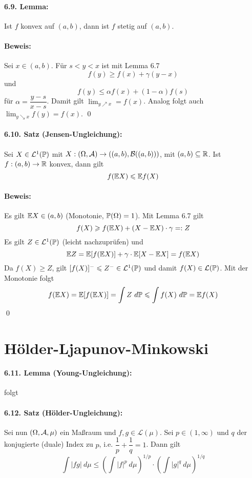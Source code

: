 \documentclass[12pt]{report}
\begin{document}
 \paragraph{6.9. Lemma:}Ist $f$ konvex auf $(a,b)$, dann ist $f$ stetig auf $(a,b)$.
 
 \paragraph{Beweis:}Sei $x\in(a,b)$. F\"ur $s<y<x$ ist mit Lemma 6.7
 $$f(y)\geq f(x)+\gamma (y-x)$$
 und 
 $$f(y)\leq \alpha f(x)+(1-\alpha)f(s)$$
 f\"ur $\alpha=\dfrac{y-s}{x-s}$. Damit gilt $\displaystyle\lim_{y\nearrow x}=f(x)$. Analog folgt auch $\lim_{y\searrow x}f(y)=f(x)$. \qed
 
 \paragraph{6.10. Satz (Jensen-Ungleichung):}Sei $X\in\mathcal{L}^1(\mathbb{P})$ mit $X:(\Omega,\mathcal{A})\to((a,b),\mathcal{B}((a,b)))$, mit $(a,b)\subseteq\mathbb{R}$. Ist $f:(a,b)\to\mathbb{R}$ konvex, dann gilt
 $$f(\mathbb{E} X)\leqslant \mathbb{E} f(X)$$
 
 \paragraph{Beweis:}Es gilt $\mathbb{E} X\in (a,b)$ (Monotonie, $\mathbb{P}(\Omega)=1$). Mit Lemma 6.7 gilt
 $$f(X)\geqslant f(\mathbb{E} X)+(X-\mathbb{E} X)\cdot \gamma=:Z$$
 Es gilt $Z\in\mathcal{L}^1(\mathbb{P})$ (leicht nachzupr\"ufen) und 
 $$\mathbb{E} Z=\mathbb{E}[f(\mathbb{E} X)]+\gamma\cdot \mathbb{E}[X-\mathbb{E} X]=f(\mathbb{E} X)$$
 Da $f(X)\geq Z$, gilt $[f(X)]^-\leqslant Z^-\in\mathcal{L}^1(\mathbb{P})$ und damit $f(X)\in\mathcal{L}(\mathbb{P})$. Mit der Monotonie folgt 
 $$f(\E X)=\E[f(\E X)]=\int Z\ d\Pp\leq\int f(X)\ d\Pp=\E f(X)$$
 \qed
 
\section*{H\"older-Ljapunov-Minkowski}

\paragraph{6.11. Lemma (Young-Ungleichung):} folgt %

\paragraph{6.12. Satz (H\"older-Ungleichung):} Sei nun $(\Omega,\mathcal{A},\mu)$ ein Ma\ss{}raum und $f,g\in\mathcal{L}(\mu)$. Sei $p\in(1,\infty)$ und $q$ der konjugierte (duale) Index zu $p$, i.e. $\dfrac{1}{p}+\dfrac{1}{q}=1$. Dann gilt 
$$\int |fg|\ d\mu\leq\left(\int |f|^p\ d\mu\right)^{1/p}\cdot\left(\int |g|^q\ d\mu\right)^{1/q}$$
\end{document}
